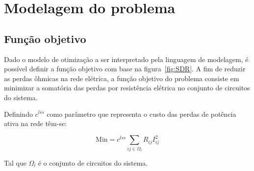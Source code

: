 \section{Modelagem do problema}

\subsection{Função objetivo}

Dado o modelo de otimização a ser interpretado pela linguagem de modelagem, é possível definir a função objetivo com base na figura~\ref{fig:SDR}.
A fim de reduzir as perdas ôhmicas na rede elétrica, a função objetivo do problema consiste em minimizar a somatória das perdas por resistência elétrica no conjunto de circuitos do sistema.

Definindo $c^{lss}$ como parâmetro que representa o custo das perdas de potência ativa na rede têm-se:

\begin{equation}
    \text{Min} = c^{lss}\sum_{ij\in\Omega_{l}}R_{ij}I_{ij}^{2}
\end{equation}

Tal que $\Omega_{l}$ é o conjunto de circuitos do sistema.